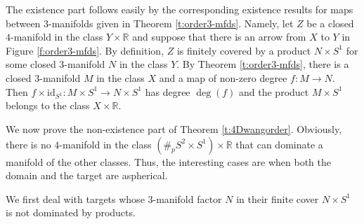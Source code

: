 \documentclass[12pt]{amsart}
\theoremstyle{remark}
\begin{document}
{} 
The existence part follows easily by the corresponding existence results for maps between $3$-manifolds given in Theorem \ref{t:order3-mfds}. Namely, let $Z$ be a closed $4$-manifold in the class $Y \times {\mathbb{R}}$ and suppose that there is an arrow from $X$ to $Y$ in Figure \ref{f:order3-mfds}. By definition, $Z$ is finitely covered by a product $N \times S^1$ for some closed $3$-manifold $N$ in the class $Y$. By Theorem \ref{t:order3-mfds}, there is a closed $3$-manifold $M$ in the class $X$ and a map of non-zero degree $f \colon M \longrightarrow N$. Then $f \times \mathrm{id}_{S^1} \colon M \times S^1 \longrightarrow N \times S^1$ has degree $\deg(f)$ and the product $M \times S^1$ belongs to the class $X \times {\mathbb{R}}$.

\medskip
{}
We now prove the non-existence part of Theorem \ref{t:4Dwangorder}. Obviously, there is no $4$-manifold in the class $(\#_p S^2 \times S^1) \times {\mathbb{R}}$ that can dominate a manifold of the other classes. Thus, the interesting cases are when both the domain and the target are aspherical.

We first deal with targets whose $3$-manifold factor $N$ in their finite cover $N \times S^1$ is not dominated by products.
\end{document}
